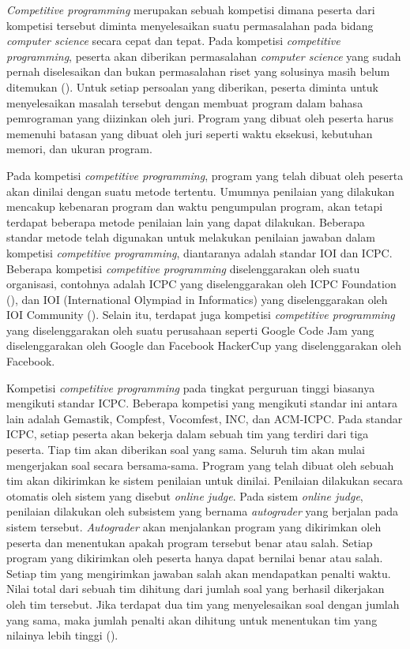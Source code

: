 \par \textit{Competitive programming} merupakan sebuah kompetisi dimana peserta dari kompetisi tersebut diminta menyelesaikan suatu permasalahan pada bidang \textit{computer science} secara cepat dan tepat. Pada kompetisi \textit{competitive programming}, peserta akan diberikan permasalahan \textit{computer science} yang sudah pernah diselesaikan dan bukan permasalahan riset yang solusinya masih belum ditemukan (\cite{halimsfcp3}). Untuk setiap persoalan yang diberikan, peserta diminta untuk menyelesaikan masalah tersebut dengan membuat program dalam bahasa pemrograman yang diizinkan oleh juri. Program yang dibuat oleh peserta harus memenuhi batasan yang dibuat oleh juri seperti waktu eksekusi, kebutuhan memori, dan ukuran program.
\par Pada kompetisi \textit{competitive programming}, program yang telah dibuat oleh peserta akan dinilai dengan suatu metode tertentu. Umumnya penilaian yang dilakukan mencakup kebenaran program dan waktu pengumpulan program, akan tetapi terdapat beberapa metode penilaian lain yang dapat dilakukan. Beberapa standar metode telah digunakan untuk melakukan penilaian jawaban dalam kompetisi \textit{competitive programming}, diantaranya adalah standar IOI dan ICPC. Beberapa kompetisi \textit{competitive programming} diselenggarakan oleh suatu organisasi, contohnya adalah ICPC yang diselenggarakan oleh ICPC Foundation (\cite{abouticpc}), dan IOI (International Olympiad in Informatics) yang diselenggarakan oleh IOI Community (\cite{ioiorg}). Selain itu, terdapat juga kompetisi \textit{competitive programming} yang diselenggarakan oleh suatu perusahaan seperti Google Code Jam yang diselenggarakan oleh Google dan Facebook HackerCup yang diselenggarakan oleh Facebook.
\par Kompetisi \textit{competitive programming} pada tingkat perguruan tinggi biasanya mengikuti standar ICPC. Beberapa kompetisi yang mengikuti standar ini antara lain adalah Gemastik, Compfest, Vocomfest, INC, dan ACM-ICPC. Pada standar ICPC, setiap peserta akan bekerja dalam sebuah tim yang terdiri dari tiga peserta. Tiap tim akan diberikan soal yang sama. Seluruh tim akan mulai mengerjakan soal secara bersama-sama. Program yang telah dibuat oleh sebuah tim akan dikirimkan ke sistem penilaian untuk dinilai. Penilaian dilakukan secara otomatis oleh sistem yang disebut \textit{online judge}. Pada sistem \textit{online judge}, penilaian dilakukan oleh subsistem yang bernama \textit{autograder} yang berjalan pada sistem tersebut. \textit{Autograder} akan menjalankan program yang dikirimkan oleh peserta dan menentukan apakah program tersebut benar atau salah. Setiap program yang dikirimkan oleh peserta hanya dapat bernilai benar atau salah. Setiap tim yang mengirimkan jawaban salah akan mendapatkan penalti waktu. Nilai total dari sebuah tim dihitung dari jumlah soal yang berhasil dikerjakan oleh tim tersebut. Jika terdapat dua tim yang menyelesaikan soal dengan jumlah yang sama, maka jumlah penalti akan dihitung untuk menentukan tim yang nilainya lebih tinggi (\cite{wfrules}).
